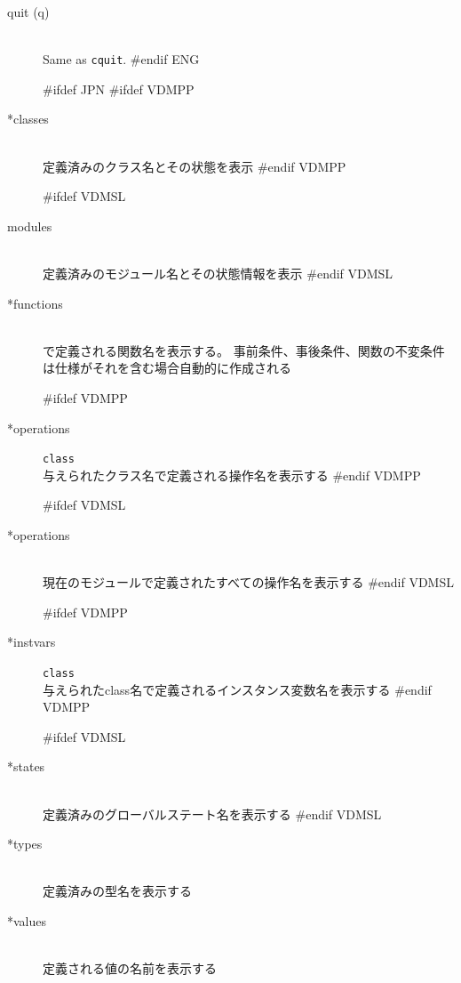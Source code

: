 \documentclass[\pformat,12pt]{article}
\newcommand{\Toolbox}{Toolbox}
\newcommand{\Toolbox}{Toolbox}
\begin{document}
\begin{description}
\item[quit (q)] \mbox{}\\
  Same as {\tt cquit}.
#endif ENG

#ifdef JPN
#ifdef VDMPP
\item[*classes] \mbox{} \\
  定義済みのクラス名とその状態を表示
#endif VDMPP

#ifdef VDMSL
\item[modules] \mbox{}\\
  定義済みのモジュール名とその状態情報を表示
#endif VDMSL

\item[*functions]  \mbox{}\\ 
  で定義される関数名を表示する。
  事前条件、事後条件、関数の不変条件は仕様がそれを含む場合自動的に作成される

#ifdef VDMPP
\item[*operations] {\tt class}\mbox{}\\
  与えられたクラス名で定義される操作名を表示する
#endif VDMPP

#ifdef VDMSL
\item[*operations] \mbox{}\\
  現在のモジュールで定義されたすべての操作名を表示する
#endif VDMSL

#ifdef VDMPP
\item[*instvars] {\tt class}\mbox{}\\
  与えられたclass名で定義されるインスタンス変数名を表示する
#endif VDMPP

#ifdef VDMSL
\item[*states]\mbox{}\\
  定義済みのグローバルステート名を表示する
#endif VDMSL

\item[*types] \mbox{}\\ 
  定義済みの型名を表示する

\item[*values] \mbox{}\\ 
  定義される値の名前を表示する


\end{description}
\end{document}
